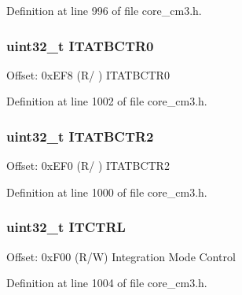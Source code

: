 Definition at line 996 of file core\+\_\+cm3.\+h.

\subsubsection[{\texorpdfstring{I\+T\+A\+T\+B\+C\+T\+R0}{ITATBCTR0}}]{ uint32\+\_\+t I\+T\+A\+T\+B\+C\+T\+R0}\hypertarget{struct_t_p_i___type_a9954c088735caa505adc113f6c64d812}{}\label{struct_t_p_i___type_a9954c088735caa505adc113f6c64d812}
Offset\+: 0x\+E\+F8 (R/ ) I\+T\+A\+T\+B\+C\+T\+R0 

Definition at line 1002 of file core\+\_\+cm3.\+h.

\subsubsection[{\texorpdfstring{I\+T\+A\+T\+B\+C\+T\+R2}{ITATBCTR2}}]{ uint32\+\_\+t I\+T\+A\+T\+B\+C\+T\+R2}\hypertarget{struct_t_p_i___type_a97fb8816ad001f4910de095aa17d9db5}{}\label{struct_t_p_i___type_a97fb8816ad001f4910de095aa17d9db5}
Offset\+: 0x\+E\+F0 (R/ ) I\+T\+A\+T\+B\+C\+T\+R2 

Definition at line 1000 of file core\+\_\+cm3.\+h.

\subsubsection[{\texorpdfstring{I\+T\+C\+T\+RL}{ITCTRL}}]{ uint32\+\_\+t I\+T\+C\+T\+RL}\hypertarget{struct_t_p_i___type_ae6b7f224b1c19c636148f991cc8db611}{}\label{struct_t_p_i___type_ae6b7f224b1c19c636148f991cc8db611}
Offset\+: 0x\+F00 (R/W) Integration Mode Control 

Definition at line 1004 of file core\+\_\+cm3.\+h.

